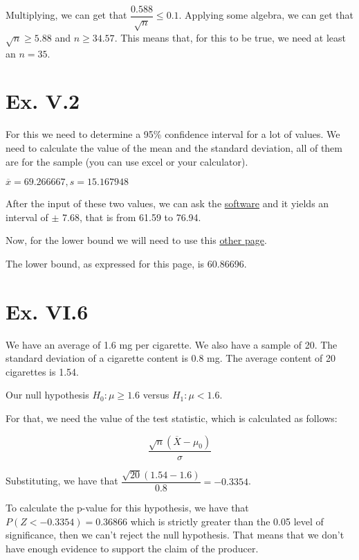 \documentclass[titlepage, letterpaper]{article}
\begin{document}
Multiplying, we can get that $\dfrac{0.588}{\sqrt{n}} \leq 0.1$.
Applying some algebra, we can get that $\sqrt{n} \geq 5.88$ and $n \geq 34.57$.
This means that, for this to be true, we need at least an $n=35$.


\section{Ex. V.2} %
\label{sec:ex_v_2}

For this we need to determine a 95\% confidence interval for a lot of values.
We need to calculate the value of the mean and the standard deviation, all of them are for the sample (you can use excel or your calculator).

\(\overline{x} = 69.266667, s = 15.167948\)

After the input of these two values, we can ask the \href{https://www.mccallum-layton.co.uk/tools/statistic-calculators/confidence-interval-for-mean-calculator/#confidence-interval-for-mean-calculator}{software} and it yields an interval of $\pm$ 7.68, that is from 61.59 to 76.94.

Now, for the lower bound we will need to use this \href{https://home.ubalt.edu/ntsbarsh/Business-stat/otherapplets/Esteem.htm}{other page}.

The lower bound, as expressed for this page, is 60.86696.

\section{Ex. VI.6} %
\label{sec:ex_vi_6}

We have an average of 1.6 mg per cigarette.
We also have a sample of 20.
The standard deviation of a cigarette content is 0.8 mg.
The average content of 20 cigarettes is 1.54.

Our null hypothesis $H_0 \colon \mu \geq 1.6$ versus $H_1 \colon \mu < 1.6$.

For that, we need the value of the test statistic, which is calculated as follows:

\begin{equation}
    \frac{\sqrt{n} (\overline{X} - \mu_0)}{\sigma}
\end{equation}

Substituting, we have that $\dfrac{\sqrt{20}(1.54 - 1.6)}{0.8} = -0.3354$.

To calculate the p-value for  this hypothesis, we have that $P(Z < -0.3354) = 0.36866$ which is strictly greater than the 0.05 level of significance, then we can't reject the null hypothesis.
That means that we don't have enough evidence to support the claim of the producer.
\end{document}
